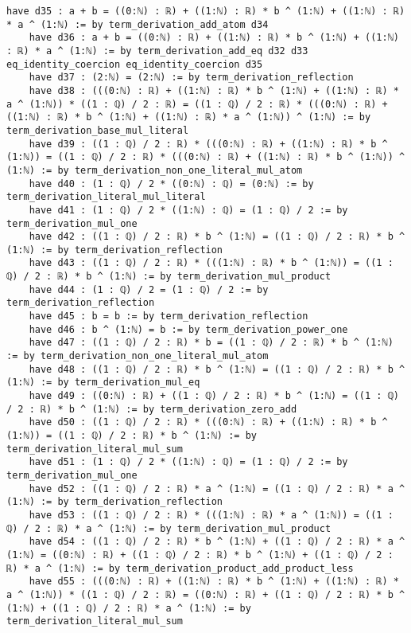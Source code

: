 \documentclass{article}
\begin{document}
\begin{tcolorbox}[colback=white!10, width=\linewidth]
\begin{lstlisting}[language=Lean4]
    have d35 : a + b = ((0:ℕ) : ℝ) + ((1:ℕ) : ℝ) * b ^ (1:ℕ) + ((1:ℕ) : ℝ) * a ^ (1:ℕ) := by term_derivation_add_atom d34
    have d36 : a + b = ((0:ℕ) : ℝ) + ((1:ℕ) : ℝ) * b ^ (1:ℕ) + ((1:ℕ) : ℝ) * a ^ (1:ℕ) := by term_derivation_add_eq d32 d33 eq_identity_coercion eq_identity_coercion d35
    have d37 : (2:ℕ) = (2:ℕ) := by term_derivation_reflection
    have d38 : (((0:ℕ) : ℝ) + ((1:ℕ) : ℝ) * b ^ (1:ℕ) + ((1:ℕ) : ℝ) * a ^ (1:ℕ)) * ((1 : ℚ) / 2 : ℝ) = ((1 : ℚ) / 2 : ℝ) * (((0:ℕ) : ℝ) + ((1:ℕ) : ℝ) * b ^ (1:ℕ) + ((1:ℕ) : ℝ) * a ^ (1:ℕ)) ^ (1:ℕ) := by term_derivation_base_mul_literal
    have d39 : ((1 : ℚ) / 2 : ℝ) * (((0:ℕ) : ℝ) + ((1:ℕ) : ℝ) * b ^ (1:ℕ)) = ((1 : ℚ) / 2 : ℝ) * (((0:ℕ) : ℝ) + ((1:ℕ) : ℝ) * b ^ (1:ℕ)) ^ (1:ℕ) := by term_derivation_non_one_literal_mul_atom
    have d40 : (1 : ℚ) / 2 * ((0:ℕ) : ℚ) = (0:ℕ) := by term_derivation_literal_mul_literal
    have d41 : (1 : ℚ) / 2 * ((1:ℕ) : ℚ) = (1 : ℚ) / 2 := by term_derivation_mul_one
    have d42 : ((1 : ℚ) / 2 : ℝ) * b ^ (1:ℕ) = ((1 : ℚ) / 2 : ℝ) * b ^ (1:ℕ) := by term_derivation_reflection
    have d43 : ((1 : ℚ) / 2 : ℝ) * (((1:ℕ) : ℝ) * b ^ (1:ℕ)) = ((1 : ℚ) / 2 : ℝ) * b ^ (1:ℕ) := by term_derivation_mul_product
    have d44 : (1 : ℚ) / 2 = (1 : ℚ) / 2 := by term_derivation_reflection
    have d45 : b = b := by term_derivation_reflection
    have d46 : b ^ (1:ℕ) = b := by term_derivation_power_one
    have d47 : ((1 : ℚ) / 2 : ℝ) * b = ((1 : ℚ) / 2 : ℝ) * b ^ (1:ℕ) := by term_derivation_non_one_literal_mul_atom
    have d48 : ((1 : ℚ) / 2 : ℝ) * b ^ (1:ℕ) = ((1 : ℚ) / 2 : ℝ) * b ^ (1:ℕ) := by term_derivation_mul_eq
    have d49 : ((0:ℕ) : ℝ) + ((1 : ℚ) / 2 : ℝ) * b ^ (1:ℕ) = ((1 : ℚ) / 2 : ℝ) * b ^ (1:ℕ) := by term_derivation_zero_add
    have d50 : ((1 : ℚ) / 2 : ℝ) * (((0:ℕ) : ℝ) + ((1:ℕ) : ℝ) * b ^ (1:ℕ)) = ((1 : ℚ) / 2 : ℝ) * b ^ (1:ℕ) := by term_derivation_literal_mul_sum
    have d51 : (1 : ℚ) / 2 * ((1:ℕ) : ℚ) = (1 : ℚ) / 2 := by term_derivation_mul_one
    have d52 : ((1 : ℚ) / 2 : ℝ) * a ^ (1:ℕ) = ((1 : ℚ) / 2 : ℝ) * a ^ (1:ℕ) := by term_derivation_reflection
    have d53 : ((1 : ℚ) / 2 : ℝ) * (((1:ℕ) : ℝ) * a ^ (1:ℕ)) = ((1 : ℚ) / 2 : ℝ) * a ^ (1:ℕ) := by term_derivation_mul_product
    have d54 : ((1 : ℚ) / 2 : ℝ) * b ^ (1:ℕ) + ((1 : ℚ) / 2 : ℝ) * a ^ (1:ℕ) = ((0:ℕ) : ℝ) + ((1 : ℚ) / 2 : ℝ) * b ^ (1:ℕ) + ((1 : ℚ) / 2 : ℝ) * a ^ (1:ℕ) := by term_derivation_product_add_product_less
    have d55 : (((0:ℕ) : ℝ) + ((1:ℕ) : ℝ) * b ^ (1:ℕ) + ((1:ℕ) : ℝ) * a ^ (1:ℕ)) * ((1 : ℚ) / 2 : ℝ) = ((0:ℕ) : ℝ) + ((1 : ℚ) / 2 : ℝ) * b ^ (1:ℕ) + ((1 : ℚ) / 2 : ℝ) * a ^ (1:ℕ) := by term_derivation_literal_mul_sum

\end{lstlisting}
\end{tcolorbox}
\end{document}
